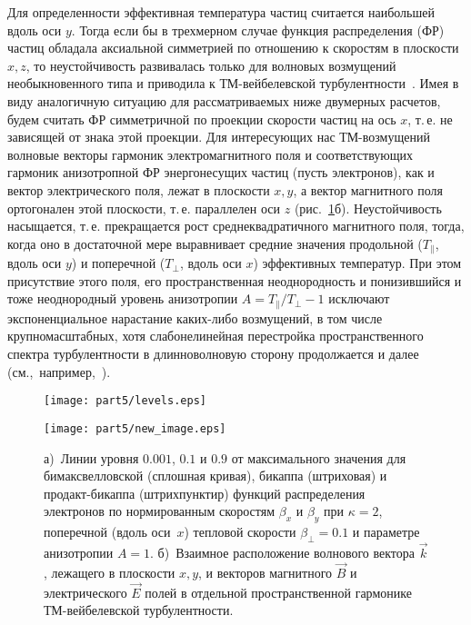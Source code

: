 Для определенности эффективная температура частиц считается наибольшей вдоль оси $y$. Тогда если бы в трехмерном случае функция распределения (ФР) частиц обладала аксиальной симметрией по отношению к скоростям в плоскости $x,z$, то неустойчивость развивалась только для волновых возмущений необыкновенного типа и приводила к ТМ-вейбелевской турбулентности~\cite{Kalman1968, Vagin2014}. Имея в виду аналогичную ситуацию для рассматриваемых ниже двумерных расчетов, будем считать ФР симметричной по проекции скорости частиц на ось $x$, т.\,е. не зависящей от знака этой проекции. Для интересующих нас ТМ-возмущений волновые векторы гармоник электромагнитного поля и соответствующих гармоник анизотропной ФР энергонесущих частиц (пусть электронов), как и вектор электрического поля, лежат в плоскости $x,y$, а вектор магнитного поля ортогонален этой плоскости, т.\,е. параллелен оси $z$ (рис.~\ref{fig:GeomIsolines}б). Неустойчивость насыщается, т.\,е. прекращается рост среднеквадратичного магнитного поля, тогда, когда оно в достаточной мере выравнивает средние значения продольной ($T_{\|}$, вдоль оси $y$) и поперечной ($T_\perp $, вдоль оси $x$) эффективных температур. При этом присутствие этого поля, его пространственная неоднородность и понизившийся и тоже неоднородный уровень анизотропии $A=T_{\|} / T_{\perp} - 1$ исключают экспоненциальное нарастание каких-либо возмущений, в том числе крупномасштабных, хотя слабонелинейная перестройка пространственного спектра турбулентности в длинноволновую сторону продолжается и далее (см.,~например,~\cite{Kocharovsky2016,Zhou2022, Borodachev2016_Radiofiz,Dieckmann2009,Romanov2004}).
\begin{figure}[h]
\begin{minipage}[c]{0.5\linewidth}
    \texttt{[image: part5/levels.eps]}
\end{minipage}
\begin{minipage}[c]{0.5\linewidth}
    \texttt{[image: part5/new\_image.eps]}
\end{minipage}
    \caption{
    а)~Линии уровня $0.001$, $0.1$ и $0.9$ от максимального значения для бимаксвелловской (сплошная кривая), бикаппа{\PunctumKappa} (штриховая) и продакт-бикаппа{\PunctumKappa} (штрихпунктир) функций распределения электронов по нормированным скоростям $\beta_x$ и $\beta_y$ при $\kappa=2$, поперечной (вдоль оси~$x$) тепловой скорости $\beta_\perp=0.1$ и параметре анизотропии $A = 1$. 
    б)~Взаимное расположение волнового вектора $\vec{k}$, лежащего в плоскости $x,y$, и векторов магнитного $\vec{B}$ и электрического $\vec{E}$ полей в отдельной пространственной гармонике ТМ-вейбелевской турбулентности.
    }
\label{fig:GeomIsolines}
\end{figure}
